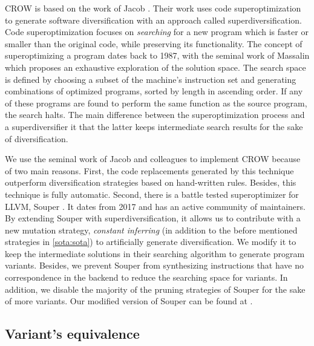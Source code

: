 CROW is based on the work of Jacob \etal \cite{jacob2008superdiversifier}. Their work uses code superoptimization to generate software diversification with an approach called superdiversification. 
Code superoptimization focuses on \emph{searching} for a new program which is faster or smaller than the original code, while preserving its functionality.
The concept of superoptimizing a program dates back to 1987, with the seminal work of Massalin \cite{Massalin1987} which proposes an exhaustive exploration of the solution space. The search space is defined by choosing a subset of the machine's instruction set and generating combinations of optimized programs, sorted by length in ascending order. If any of these programs are found to perform the same function as the source program, the search halts. The main difference between the superoptimization process and a superdiversifier it that the latter keeps intermediate search results for the sake of diversification. 

We use the seminal work of Jacob and colleagues to implement CROW because of two main reasons.
First, the code replacements generated by this technique outperform diversification strategies based on hand-written rules. Besides, this technique is fully automatic.
Second, there is a battle tested superoptimizer for LLVM, Souper \cite{Sasnauskas2017Souper:Superoptimizer}. It dates from 2017 and has an active community of maintainers. By extending Souper with superdiversification, it allows us to contribute with a new mutation strategy, \emph{constant inferring} (in addition to the before mentioned strategies in \autoref{sota:sota}) to artificially generate diversification. We modify it to keep the intermediate solutions in their searching algorithm to generate program variants. Besides, 
we prevent Souper from synthesizing instructions that have no correspondence in the \wasm backend to reduce the searching space for variants. In addition, we disable the majority of the pruning strategies of Souper for the sake of more variants. Our modified version of Souper can be found at \todo{}.

\subsection*{Variant's equivalence}

\todo{}

